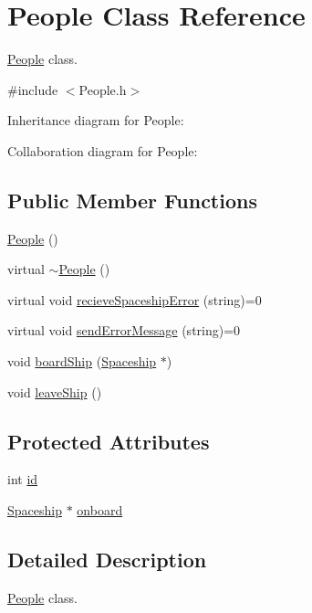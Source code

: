 \hypertarget{classPeople}{}\section{People Class Reference}
\label{classPeople}


\hyperlink{classPeople}{People} class.  




{\ttfamily \#include $<$People.\+h$>$}



Inheritance diagram for People\+:


Collaboration diagram for People\+:
\subsection*{Public Member Functions}
\begin{DoxyCompactItemize}
\item 
\hyperlink{classPeople_aae1408eddfd15a5007003ecdf1507941}{People} ()
\item 
virtual \hyperlink{classPeople_a26b0c041fafa38a1f84e0d51742e886a}{$\sim$\+People} ()
\item 
virtual void \hyperlink{classPeople_a0685df78be631783138865e03cc7c85d}{recieve\+Spaceship\+Error} (string)=0
\item 
virtual void \hyperlink{classPeople_a572a35170f61d1848eb04b65baafb057}{send\+Error\+Message} (string)=0
\item 
void \hyperlink{classPeople_a66c99da939fe89614360953a3619a271}{board\+Ship} (\hyperlink{classSpaceship}{Spaceship} $\ast$)
\item 
void \hyperlink{classPeople_a5e87ed1cfd4d4d90b95e3b2196c7687e}{leave\+Ship} ()
\end{DoxyCompactItemize}
\subsection*{Protected Attributes}
\begin{DoxyCompactItemize}
\item 
int \hyperlink{classPeople_ab8216a756c93da727d2626dfb063f82a}{id}
\item 
\hyperlink{classSpaceship}{Spaceship} $\ast$ \hyperlink{classPeople_a103de9b80f0b47e01dc24ac48ec301b2}{onboard}
\end{DoxyCompactItemize}


\subsection{Detailed Description}
\hyperlink{classPeople}{People} class. 

